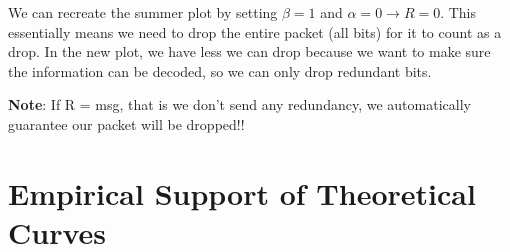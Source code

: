 \documentclass[leqno,twocolumn]{article}
\begin{document}
We can recreate the summer plot by setting $\beta = 1$ and $\alpha = 0 \rightarrow R = 0$. This essentially means we need to drop the entire packet (all bits) for it to count as a drop. In the new plot, we have less we can drop because we want to make sure the information can be decoded, so we can only drop redundant bits.

\begin{center}
\end{center}

\textbf{Note}: If R = msg, that is we don't send any redundancy, we automatically guarantee our packet will be dropped!!

\section{Empirical Support of Theoretical Curves}
\end{document}
